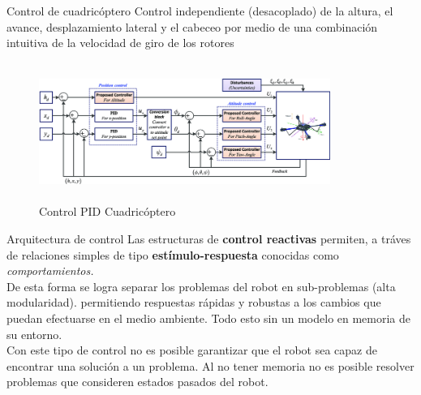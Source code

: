 \documentclass[
	11pt, %
]{beamer}
\begin{document}
\begin{frame}{Control de cuadric\'{o}ptero}
  Control independiente (desacoplado) de la altura, el avance, desplazamiento lateral y el cabeceo por medio de una combinaci\'{o}n intuitiva de la velocidad de giro de los rotores %

  \begin{figure}
    \centering
    \includegraphics[width=9.5cm, height=4.5cm]{control_drone}
    \caption[Caption for LOF]{Control PID Cuadric\'{o}ptero\protect\footnotemark}
  \end{figure}
  
\end{frame}



\begin{frame}{Arquitectura de control}
  Las estructuras de \textbf{control reactivas} permiten, a tr\'{a}ves de relaciones simples de tipo \textbf{est\'{i}mulo-respuesta} conocidas como \textit{comportamientos.}\\

  De esta forma se logra separar los problemas del robot en sub-problemas (alta modularidad). permitiendo respuestas r\'{a}pidas y robustas a los cambios que puedan efectuarse en el medio ambiente. Todo esto sin un modelo en memoria de su entorno.\\
  
  Con este tipo de control no es posible garantizar que el robot sea capaz de encontrar una soluci\'{o}n a un problema. Al no tener memoria no es posible resolver problemas que consideren estados pasados del robot.\\
    
\end{frame}
\end{document}
